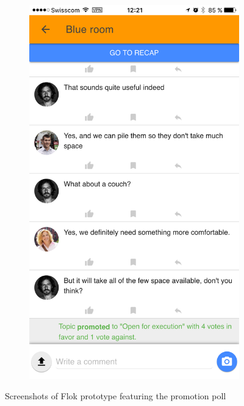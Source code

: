 \documentclass[a4paper,12pt,twoside]{article}
\begin{document}
\begin{figure}[!htb]
\begin{subfigure}[t]{.32\textwidth}
        \includegraphics[width=\textwidth]{images/promotionPoll_approved.png}
    \end{subfigure}
    \caption{Screenshots of Flok prototype featuring the promotion poll}
    \label{fig.promotionPoll}
\end{figure}
\end{document}
